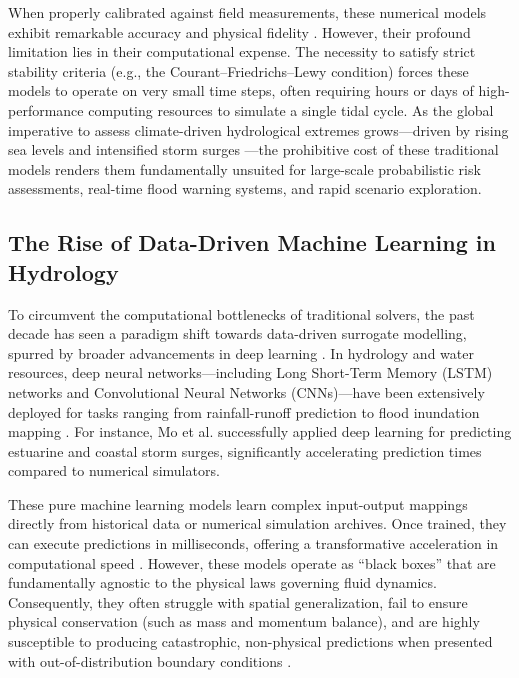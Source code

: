 When properly calibrated against field measurements, these numerical models exhibit remarkable accuracy and physical fidelity \cite{Bates2010, Quirogaetal2020}. However, their profound limitation lies in their computational expense. The necessity to satisfy strict stability criteria (e.g., the Courant--Friedrichs--Lewy condition) forces these models to operate on very small time steps, often requiring hours or days of high-performance computing resources to simulate a single tidal cycle. As the global imperative to assess climate-driven hydrological extremes grows---driven by rising sea levels and intensified storm surges \cite{IPCC2021, Vousdoukas2018, Alfieri2017}---the prohibitive cost of these traditional models renders them fundamentally unsuited for large-scale probabilistic risk assessments, real-time flood warning systems, and rapid scenario exploration.

\subsection{The Rise of Data-Driven Machine Learning in Hydrology}

To circumvent the computational bottlenecks of traditional solvers, the past decade has seen a paradigm shift towards data-driven surrogate modelling, spurred by broader advancements in deep learning \cite{LeCun2015, Reichstein2019}. In hydrology and water resources, deep neural networks---including Long Short-Term Memory (LSTM) networks and Convolutional Neural Networks (CNNs)---have been extensively deployed for tasks ranging from rainfall-runoff prediction to flood inundation mapping \cite{Shen2018, Sit2020, Bentivoglio2023}. For instance, Mo et al. \cite{Mo2020} successfully applied deep learning for predicting estuarine and coastal storm surges, significantly accelerating prediction times compared to numerical simulators. 

These pure machine learning models learn complex input-output mappings directly from historical data or numerical simulation archives. Once trained, they can execute predictions in milliseconds, offering a transformative acceleration in computational speed \cite{Brunton2020, Balogun2024}. However, these models operate as ``black boxes'' that are fundamentally agnostic to the physical laws governing fluid dynamics. Consequently, they often struggle with spatial generalization, fail to ensure physical conservation (such as mass and momentum balance), and are highly susceptible to producing catastrophic, non-physical predictions when presented with out-of-distribution boundary conditions \cite{Karniadakis2021, Cuomo2022}.

